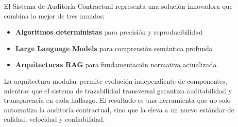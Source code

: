 \documentclass[12pt,a4paper]{article}
\begin{document}
El Sistema de Auditoría Contractual representa una solución innovadora que combina lo mejor de tres mundos:

\begin{itemize}[leftmargin=*]
    \item \textbf{Algoritmos deterministas} para precisión y reproducibilidad
    \item \textbf{Large Language Models} para comprensión semántica profunda
    \item \textbf{Arquitecturas RAG} para fundamentación normativa actualizada
\end{itemize}

La arquitectura modular permite evolución independiente de componentes, mientras que el sistema de trazabilidad transversal garantiza auditabilidad y transparencia en cada hallazgo. El resultado es una herramienta que no solo automatiza la auditoría contractual, sino que la eleva a un nuevo estándar de calidad, velocidad y confiabilidad.
\end{document}
